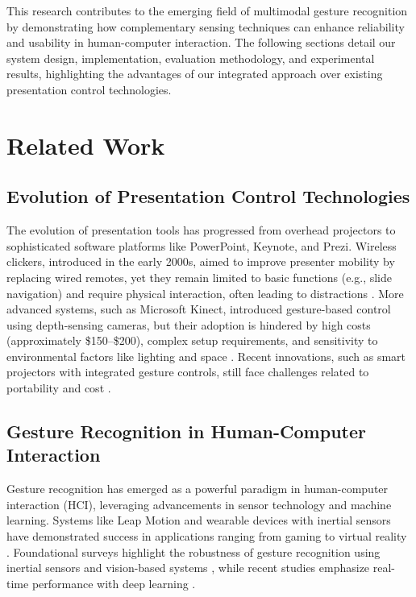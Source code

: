 \documentclass[arxiv,usenatbib]{iupartex}
\begin{document}
This research contributes to the emerging field of multimodal gesture recognition by demonstrating how complementary sensing techniques can enhance reliability and usability in human-computer interaction. The following sections detail our system design, implementation, evaluation methodology, and experimental results, highlighting the advantages of our integrated approach over existing presentation control technologies.

\section{Related Work}
\subsection{Evolution of Presentation Control Technologies}
The evolution of presentation tools has progressed from overhead projectors to sophisticated software platforms like PowerPoint, Keynote, and Prezi. Wireless clickers, introduced in the early 2000s, aimed to improve presenter mobility by replacing wired remotes, yet they remain limited to basic functions (e.g., slide navigation) and require physical interaction, often leading to distractions \cite{Johnson2018}. More advanced systems, such as Microsoft Kinect, introduced gesture-based control using depth-sensing cameras, but their adoption is hindered by high costs (approximately \$150--\$200), complex setup requirements, and sensitivity to environmental factors like lighting and space \cite{Lee2019, Chen2015}. Recent innovations, such as smart projectors with integrated gesture controls, still face challenges related to portability and cost \cite{Zhao2022}.

\subsection{Gesture Recognition in Human-Computer Interaction}
Gesture recognition has emerged as a powerful paradigm in human-computer interaction (HCI), leveraging advancements in sensor technology and machine learning. Systems like Leap Motion and wearable devices with inertial sensors have demonstrated success in applications ranging from gaming to virtual reality \cite{Wang2021, Rautaray2012}. Foundational surveys highlight the robustness of gesture recognition using inertial sensors and vision-based systems \cite{Mitra2007}, while recent studies emphasize real-time performance with deep learning \cite{Zhang2018, Liu2022}.
\end{document}
